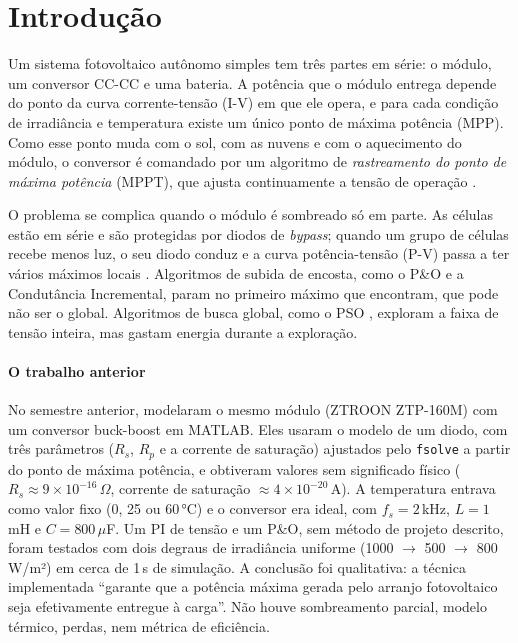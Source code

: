\documentclass[3p,authoryear]{elsarticle}
\begin{document}
\section{Introdução}
\label{sec:intro}

Um sistema fotovoltaico autônomo simples tem três partes em série: o módulo, um conversor
CC-CC e uma bateria. A potência que o módulo entrega depende do ponto da curva
corrente-tensão (I-V) em que ele opera, e para cada condição de irradiância e temperatura
existe um único ponto de máxima potência (MPP). Como esse ponto muda com o sol, com as
nuvens e com o aquecimento do módulo, o conversor é comandado por um algoritmo de
\emph{rastreamento do ponto de máxima potência} (MPPT), que ajusta continuamente a tensão de
operação \citep{esram}.

O problema se complica quando o módulo é sombreado só em parte. As células estão em série e
são protegidas por diodos de \emph{bypass}; quando um grupo de células recebe menos luz, o
seu diodo conduz e a curva potência-tensão (P-V) passa a ter vários máximos locais
\citep{patel}. Algoritmos de subida de encosta, como o P\&O e a Condutância Incremental,
param no primeiro máximo que encontram, que pode não ser o global. Algoritmos de busca
global, como o PSO \citep{kennedy,ishaquepso}, exploram a faixa de tensão inteira, mas
gastam energia durante a exploração.

\paragraph{O trabalho anterior} No semestre anterior, \citet{anterior} modelaram o mesmo
módulo (ZTROON ZTP-160M) com um conversor buck-boost em MATLAB. Eles usaram o modelo de um
diodo, com três parâmetros ($R_s$, $R_p$ e a corrente de saturação) ajustados pelo
\texttt{fsolve} a partir do ponto de máxima potência, e obtiveram valores sem significado
físico ($R_s \approx 9\times10^{-16}\,\Omega$, corrente de saturação $\approx
4\times10^{-20}$\,A). A temperatura entrava como valor fixo (0, 25 ou 60\,°C) e o conversor era ideal, com
$f_s = 2$\,kHz, $L = 1$\,mH e $C = 800\,\mu$F. Um PI de tensão e um P\&O, sem método de
projeto descrito, foram testados com dois degraus de irradiância uniforme (1000 $\to$ 500 $\to$
800\,W/m²) em cerca de 1\,s de simulação. A conclusão foi qualitativa: a técnica implementada
``garante que a potência máxima gerada pelo arranjo fotovoltaico seja efetivamente entregue à
carga''. Não houve sombreamento parcial, modelo térmico,
perdas, nem métrica de eficiência.
\end{document}
